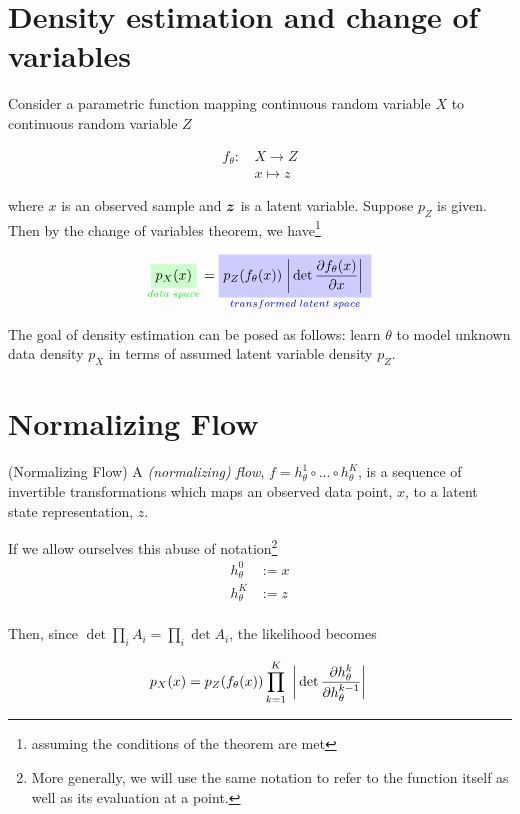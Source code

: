 \documentclass[10pt]{beamer}
\begin{document}
\section{Density estimation and change of variables} 



\begin{frame}
Consider a parametric function mapping continuous random variable $X$ to continuous random variable $Z$

\begin{align*}
f_\theta:  &\, X \to Z \\
			&\, x \mapsto z 
\end{align*}

where $x$ is an observed sample and ${\boldsymbol z}$ is a latent variable.  Suppose $p_Z$ is given.   Then by the change of variables theorem, we have\footnote{assuming the conditions of the theorem are met}

\[ \labeledgreenbox{data \; space}{$p_X(x)$} = \labeledbluebox{transformed \; latent \; space}{$p_Z( f_\theta(x) ) \absdet{\df{\partial f_\theta(x)}{\partial x}}$}  \]  
\end{frame}

\begin{frame}
The goal of density estimation can be posed as follows: learn $\theta$ to model unknown data density $p_X$ in terms of assumed latent variable density $p_Z$.  
\end{frame}

\section{Normalizing Flow} 

\begin{frame}
\begin{definition}{(Normalizing Flow)} \label{flow}
A \textit{(normalizing) flow}, $f=h_\theta^1 \circ ... \circ h_\theta^K$, is a sequence of invertible transformations which maps an observed data point, $x$, to a latent state representation, $z$. 
\end{definition}

If we allow ourselves this abuse of notation\footnote{More generally, we will use the same notation to refer to the function itself as well as its evaluation at a point.}
\begin{align*}
h_\theta^0 &:=x \\
h_\theta^K &:= z \\
\end{align*}

Then, since $\det \prod_i A_i = \prod_i \det A_i$, the likelihood becomes 

\begin{equation} 
\label{cov}
p_X(x) = p_Z( f_\theta(x) ) \displaystyle\prod_{k=1}^K\; \bigg\lvert \det{\displaystyle\frac{\partial h_\theta^k}{\partial h_\theta^{k-1}}} \bigg\rvert \;  
\end{equation}
\end{frame}
\end{document}
